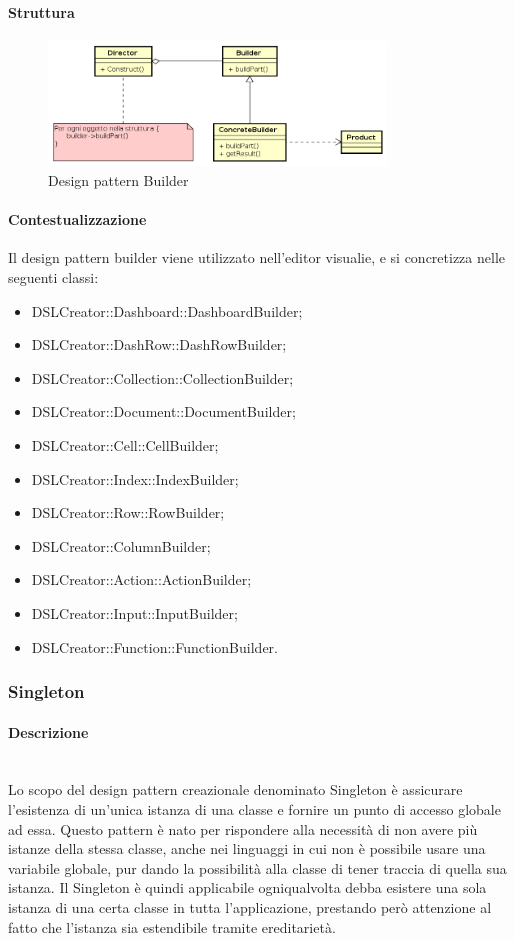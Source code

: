 \paragraph{Struttura}
\begin{figure}[H]
\centering
\includegraphics[width=0.8\textwidth]{res/sections/backend/builder.png}
\caption{Design pattern Builder}
\end{figure}
\paragraph{Contestualizzazione}
Il design pattern builder viene utilizzato nell'editor visualie, e si concretizza nelle seguenti classi:
\begin{itemize}
\item DSLCreator::Dashboard::DashboardBuilder;
\item DSLCreator::DashRow::DashRowBuilder;
\item DSLCreator::Collection::CollectionBuilder;
\item DSLCreator::Document::DocumentBuilder;
\item DSLCreator::Cell::CellBuilder;
\item DSLCreator::Index::IndexBuilder;
\item DSLCreator::Row::RowBuilder;
\item DSLCreator::ColumnBuilder;
\item DSLCreator::Action::ActionBuilder;
\item DSLCreator::Input::InputBuilder;
\item DSLCreator::Function::FunctionBuilder.
\end{itemize}
\subsubsection{Singleton}
\paragraph{Descrizione} \mbox{} \\
Lo scopo del design pattern creazionale denominato Singleton è assicurare l’esistenza di un'unica istanza di una classe e fornire un punto di accesso globale ad essa. Questo pattern è nato per rispondere alla necessità di non avere più istanze della stessa classe, anche nei linguaggi in cui non è possibile usare una variabile globale, pur dando la possibilità alla classe di tener traccia di quella sua istanza. Il Singleton è quindi applicabile ogniqualvolta debba esistere una sola istanza di una certa classe in tutta l’applicazione, prestando però attenzione al fatto che l’istanza sia estendibile tramite ereditarietà.
